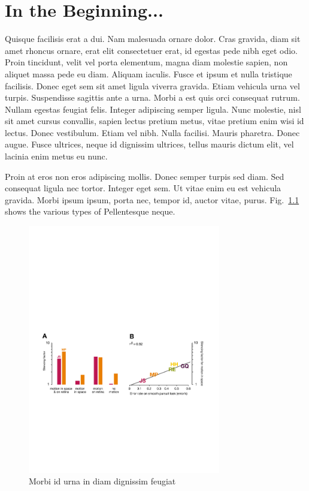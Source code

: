 \chapter{In the Beginning...} \label{ch:chapter1}

Quisque facilisis erat a dui. Nam malesuada ornare dolor. Cras gravida, diam sit amet rhoncus ornare, erat elit consectetuer erat, id egestas pede nibh eget odio. Proin tincidunt, velit vel porta elementum, magna diam molestie sapien, non aliquet massa pede eu diam. Aliquam iaculis. Fusce et ipsum et nulla tristique facilisis. Donec eget sem sit amet ligula viverra gravida. Etiam vehicula urna vel turpis. Suspendisse sagittis ante a urna. Morbi a est quis orci consequat rutrum. Nullam egestas feugiat felis. Integer adipiscing semper ligula. Nunc molestie, nisl sit amet cursus convallis, sapien lectus pretium metus, vitae pretium enim wisi id lectus. Donec vestibulum. Etiam vel nibh. Nulla facilisi. Mauris pharetra. Donec augue. Fusce ultrices, neque id dignissim ultrices, tellus mauris dictum elit, vel lacinia enim metus eu nunc.

Proin at eros non eros adipiscing mollis. Donec semper turpis sed diam. Sed consequat ligula nec tortor. Integer eget sem. Ut vitae enim eu est vehicula gravida. Morbi ipsum ipsum, porta nec, tempor id, auctor vitae, purus. Fig.~\ref{fig:1fig3} shows the various types of Pellentesque neque.

\begin{figure}[htb]
\begin{center}
\includegraphics[width=0.75\textwidth]{dissertation/figures/fig3}
\caption{Morbi id urna in diam dignissim feugiat \protect\cite{Eigen1971}}
\label{fig:1fig3}
\end{center}
\end{figure}

